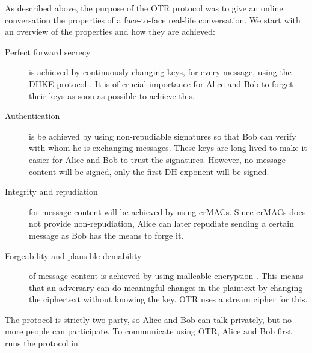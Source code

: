 As described above, the purpose of the \ac{OTR} protocol was to give an online 
conversation the properties of a face-to-face real-life conversation.
We start with an overview of the properties and how they are achieved:
\begin{description}
  \item[Perfect forward secrecy] is achieved by continuously changing keys, for 
    every message, using the \ac{DHKE} protocol \cite{dh}.
    It is of crucial importance for Alice and Bob to forget their keys as soon 
    as possible to achieve this.

  \item[Authentication] is be achieved by using non-repudiable signatures so 
    that Bob can verify with whom he is exchanging messages.
    These keys are long-lived to make it easier for Alice and Bob to trust the 
    signatures.
    However, no message content will be signed, only the first \ac{DH} exponent 
    will be signed.

  \item[Integrity and repudiation] for message content will be achieved by 
    using \acp{crMAC}.
    Since \acp{crMAC} does not provide non-repudiation, Alice can later 
    repudiate sending a certain message as Bob has the means to forge it.

  \item[Forgeability and plausible deniability] of message content is achieved 
    by using malleable encryption \cite{nonmalleable}.
    This means that an adversary can do meaningful changes in the plaintext by 
    changing the ciphertext without knowing the key.
    \ac{OTR} uses a stream cipher for this.
\end{description}

The protocol is strictly two-party, so Alice and Bob can talk privately, but no 
more people can participate.
To communicate using \ac{OTR}, Alice and Bob first runs the protocol in 
.

